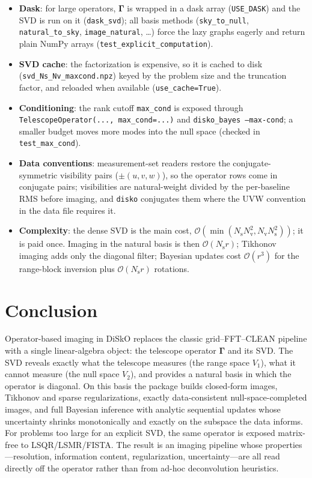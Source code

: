 \documentclass[11pt,a4paper]{article}
\newcommand{\Ns}{N_{\mathrm{s}}}
\newcommand{\Nv}{N_{\mathrm{v}}}
\newcommand{\Gammam}{\boldsymbol{\Gamma}}
\begin{document}
\begin{itemize}
  \item \textbf{Dask}: for large operators, $\Gammam$ is wrapped in a dask
        array (\texttt{USE\_DASK}) and the SVD is run on it
        (\texttt{dask\_svd}); all basis methods (\texttt{sky\_to\_null},
        \texttt{natural\_to\_sky}, \texttt{image\_natural}, \dots) force the
        lazy graphs eagerly and return plain NumPy arrays
        (\texttt{test\_explicit\_computation}).
  \item \textbf{SVD cache}: the factorization is expensive, so it is cached to
        disk (\texttt{svd\_Ns\_Nv\_maxcond.npz}) keyed by the problem size and
        the truncation factor, and reloaded when available
        (\texttt{use\_cache=True}).
  \item \textbf{Conditioning}: the rank cutoff \texttt{max\_cond} is exposed
        through \texttt{TelescopeOperator(..., max\_cond=...)} and
        \texttt{disko\_bayes --max-cond}; a smaller budget moves more modes
        into the null space (checked in \texttt{test\_max\_cond}).
  \item \textbf{Data conventions}: measurement-set readers restore the
        conjugate-symmetric visibility pairs ($\pm(u,v,w)$), so the operator
        rows come in conjugate pairs; visibilities are natural-weight divided
        by the per-baseline RMS before imaging, and \texttt{disko} conjugates
        them where the UVW convention in the data file requires it.
  \item \textbf{Complexity}: the dense SVD is the main cost,
        $\mathcal{O}(\min(\Ns\Nv^2,\Nv\Ns^2))$; it is paid once. Imaging in
        the natural basis is then $\mathcal{O}(\Ns r)$; Tikhonov imaging adds
        only the diagonal filter; Bayesian updates cost
        $\mathcal{O}(r^3)$ for the range-block inversion plus
        $\mathcal{O}(\Ns r)$ rotations.
\end{itemize}

\section{Conclusion}

Operator-based imaging in DiSkO replaces the classic grid--FFT--CLEAN pipeline
with a single linear-algebra object: the telescope operator $\Gammam$ and its
SVD. The SVD reveals exactly what the telescope measures (the range space
$V_1$), what it cannot measure (the null space $V_2$), and provides a natural
basis in which the operator is diagonal. On this basis the package builds
closed-form images, Tikhonov and sparse regularizations, exactly
data-consistent null-space-completed images, and full Bayesian inference with
analytic sequential updates whose uncertainty shrinks monotonically and
exactly on the subspace the data informs. For problems too large for an
explicit SVD, the
same operator is exposed matrix-free to LSQR/LSMR/FISTA. The result is an
imaging pipeline whose properties---resolution, information content,
regularization, uncertainty---are all read directly off the operator rather
than from ad-hoc deconvolution heuristics.
\end{document}
